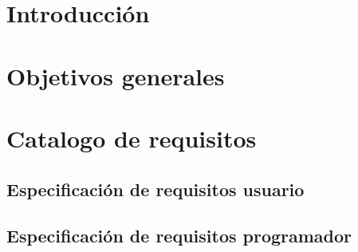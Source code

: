 
\section{Introducción}\label{introduccion-requisitos}

\section{Objetivos generales}\label{objetivos-generales}

\section{Catalogo de requisitos}\label{catalogo-requisitos}

\subsection{Especificación de requisitos usuario}\label{espeficiaciones-requisitos-usuario}
\subsection{Especificación de requisitos programador}\label{espeficiaciones-requisitos-programador}


